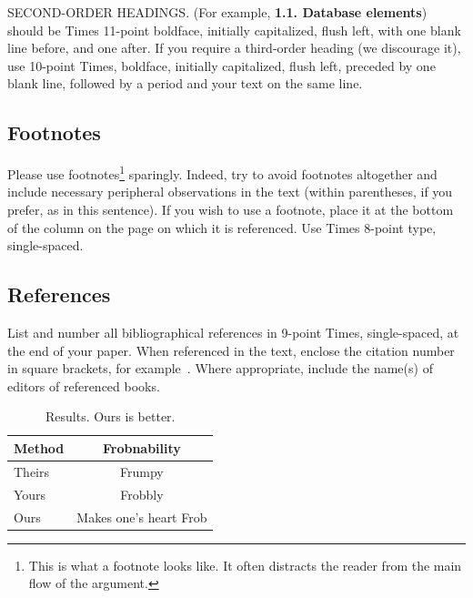 \documentclass[10pt,twocolumn,letterpaper]{article}
\begin{document}
SECOND-ORDER HEADINGS. (For example, { \bf 1.1. Database elements})
should be Times 11-point boldface, initially capitalized, flush left,
with one blank line before, and one after. If you require a
third-order heading (we discourage it), use 10-point Times, boldface,
initially capitalized, flush left, preceded by one blank line,
followed by a period and your text on the same line.

\subsection{Footnotes}

Please use footnotes\footnote {This is what a footnote looks like.  It
  often distracts the reader from the main flow of the argument.}
sparingly.  Indeed, try to avoid footnotes altogether and include
necessary peripheral observations in the text (within parentheses, if
you prefer, as in this sentence).  If you wish to use a footnote,
place it at the bottom of the column on the page on which it is
referenced. Use Times 8-point type, single-spaced.


\subsection{References}

List and number all bibliographical references in 9-point Times,
single-spaced, at the end of your paper. When referenced in the text,
enclose the citation number in square brackets, for
example~\cite{Authors12}.  Where appropriate, include the name(s) of
editors of referenced books.

\begin{table}
  \begin{center}
    \begin{tabular}{|l|c|}
      \hline
      Method & Frobnability \\
      \hline\hline
      Theirs & Frumpy \\
      Yours & Frobbly \\
      Ours & Makes one's heart Frob\\
      \hline
    \end{tabular}
  \end{center}
  \caption{Results.   Ours is better.}
\end{table}

\end{document}
